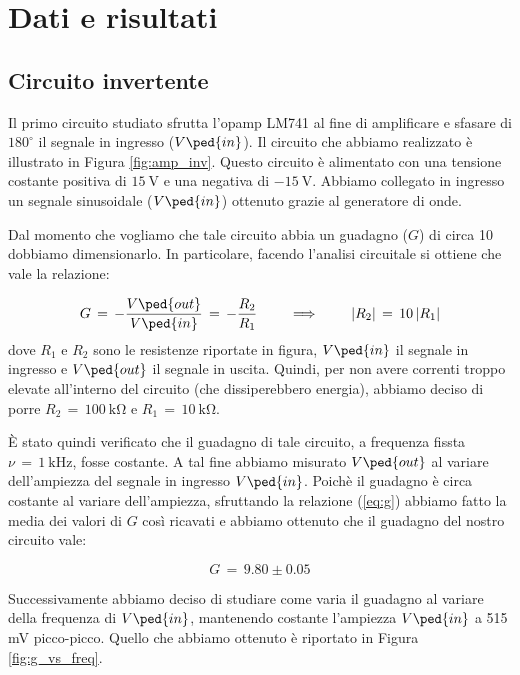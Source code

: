 \section*{Dati e risultati}

\subsection*{Circuito invertente}

Il primo circuito studiato sfrutta l'opamp LM741 al fine di amplificare e sfasare di $180^\circ$ il segnale in ingresso ($V\ped{in}$). Il circuito che abbiamo realizzato è illustrato in Figura \ref{fig:amp_inv}.
Questo circuito è alimentato con una tensione costante positiva di $\SI{+15}{\volt}$ e una negativa di $\SI{-15}{\volt}$.
Abbiamo collegato in ingresso un segnale sinusoidale ($V\ped{in}$) ottenuto grazie al generatore di onde.

Dal momento che vogliamo che tale circuito abbia un guadagno ($G$) di circa 10 dobbiamo dimensionarlo. In particolare, facendo l'analisi circuitale si ottiene che vale la relazione:

\begin{equation}
        G\,=\,-\frac{V\ped{out}}{V\ped{in}}\,=\,-\frac{R_2}{R_1} \qquad \implies \qquad |R_2|\,=\,10\,|R_1|
        \label{eq:g}
\end{equation}
%
dove $R_1$ e $R_2$ sono le resistenze riportate in figura, $V\ped{in}$ il segnale in ingresso e $V\ped{out}$ il segnale in uscita. Quindi, per non avere correnti troppo elevate all'interno del circuito (che dissiperebbero energia), abbiamo deciso di porre $R_2\,=\,\SI{100}{\kilo\ohm}$ e $R_1\,=\,\SI{10}{\kilo\ohm}$.

È stato quindi verificato che il guadagno di tale circuito, a frequenza fissta $\nu\,=\,\SI{1}{\kilo\hertz}$, fosse costante. A tal fine abbiamo misurato $V\ped{out}$ al variare dell'ampiezza del segnale in ingresso $V\ped{in}$. Poichè il guadagno è circa costante al variare dell'ampiezza, sfruttando la relazione (\ref{eq:g}) abbiamo fatto la media dei valori di $G$ così ricavati e abbiamo ottenuto che il guadagno del nostro circuito vale:

\begin{equation}
        G\,=\, 9.80 \pm 0.05
\end{equation}

Successivamente abbiamo deciso di studiare come varia il guadagno al variare della frequenza di $V\ped{in}$, mantenendo costante l'ampiezza $V\ped{in}$ a 515 mV picco-picco. Quello che abbiamo ottenuto è riportato in Figura \ref{fig:g_vs_freq}.

